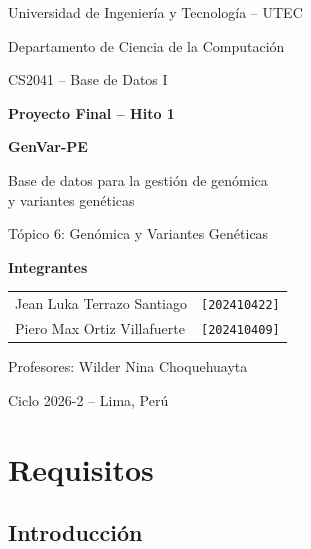 \documentclass[11pt,a4paper]{article}
\begin{document}
\sloppy

\begin{titlepage}
\centering
{\large Universidad de Ingeniería y Tecnología -- UTEC\par}
\vspace{0.3cm}
{\large Departamento de Ciencia de la Computación\par}
\vspace{2.2cm}
{\large CS2041 -- Base de Datos I\par}
\vspace{0.8cm}
{\LARGE\bfseries Proyecto Final -- Hito 1\par}
\vspace{0.5cm}
{\Huge\bfseries GenVar-PE\par}
\vspace{0.3cm}
{\Large Base de datos para la gestión de genómica\\ y variantes genéticas\par}
\vspace{0.4cm}
{\large Tópico 6: Genómica y Variantes Genéticas\par}
\vspace{2.2cm}
{\large\bfseries Integrantes\par}
\vspace{0.3cm}
\begin{tabular}{lc}
Jean Luka Terrazo Santiago & \texttt{[202410422]}\\
Piero Max Ortiz Villafuerte & \texttt{[202410409]}\\
\end{tabular}
\vfill
{\large Profesores: Wilder Nina Choquehuayta\par}
\vspace{0.3cm}
{\large Ciclo 2026-2 \quad -- \quad Lima, Perú\par}
\end{titlepage}

\tableofcontents
\newpage

\section{Requisitos}

\subsection{Introducción}
\end{document}
